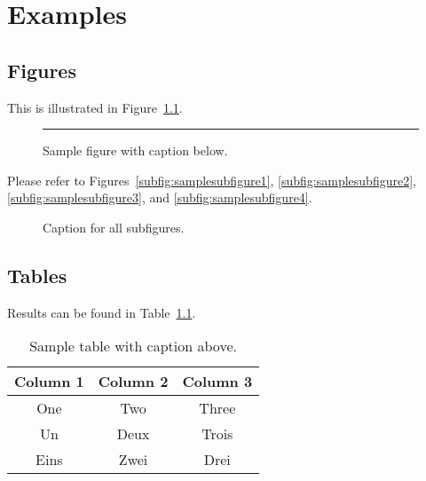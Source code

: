 \chapter{Examples}
\label{chap:Examples}

\section{Figures}
\label{sec:Figures}

\blindtext
This is illustrated in Figure~\ref{fig:samplefigure}.

\begin{figure}[t]
    \centering
    \rule{0.99\textwidth}{5cm}
    \caption{Sample figure with caption below.}
    \label{fig:samplefigure}
\end{figure}

\Blindtext
\blindtext
Please refer to Figures~\ref{subfig:samplesubfigure1}, \ref{subfig:samplesubfigure2}, \ref{subfig:samplesubfigure3}, and \ref{subfig:samplesubfigure4}.

\begin{figure}[t]
  \centering
  \subfloat[Caption a]{\rule{0.22\textwidth}{2cm}\label{subfig:samplesubfigure1}}\quad
  \subfloat[Caption b]{\rule{0.22\textwidth}{2cm}\label{subfig:samplesubfigure2}}\quad
  \subfloat[Caption c]{\rule{0.22\textwidth}{2cm}\label{subfig:samplesubfigure3}}\quad
  \subfloat[Caption d]{\rule{0.22\textwidth}{2cm}\label{subfig:samplesubfigure4}}
  \caption{Caption for all subfigures.}
  \label{fig:samplesubfigures}
\end{figure}


\section{Tables}
\label{sec:Tables}

\blindtext
Results can be found in Table~\ref{tab:sampletable}.

\begin{table}[t]
    \caption{Sample table with caption above.}
    \centering
    \begin{tabular}{ccc}
        \toprule
        Column 1    &   Column 2    &   Column 3\\
        \midrule
        One         &   Two         &   Three\\
        Un          &   Deux        &   Trois\\
        Eins        &   Zwei        &   Drei\\
        \bottomrule
    \end{tabular}
    \label{tab:sampletable}
\end{table}

